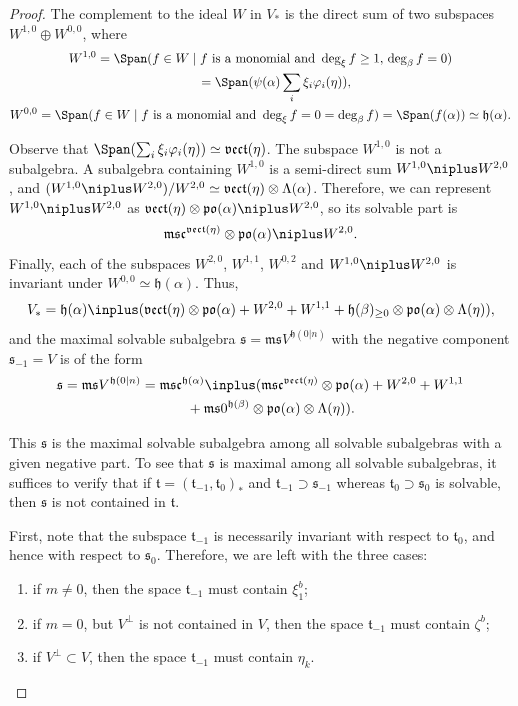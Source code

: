 \documentclass[10pt,a4paper]{amsart}
\newcommand {\fc} {{\mathfrak{c}}}
\newcommand {\fh} {{\mathfrak{h}}}
\newcommand {\fm} {{\mathfrak{m}}}
\newcommand {\fpo} {{\mathfrak{po}}}
\newcommand {\fs} {{\mathfrak{s}}}
\newcommand {\ft} {{\mathfrak{t}}}
\newcommand {\fvect} {{\mathfrak{vect}}} %
\newcommand {\<} [2] {{\left.\vphantom{#2}\right.^{#1\!}\!{#2}}}
\numberwithin{equation}{section}
\begin{document}
\begin{proof}
The complement to the ideal $W$ in $V_*$ is the direct sum of two subspaces $W^{1,0}\oplus W^{0,0}$, where
\begin{gather*}
 W^{1,0}=\Span(f\in W\mid f   \ \text{is a monomial and}\ \deg_\xi f\ge 1,\, \deg_\beta f=0) \\
 \hphantom{W^{1,0}}{} =\Span(\psi(\alpha)\sum_i \xi_i\varphi_i(\eta)),\\
 W^{0,0}=\Span(f\in W\mid f \   \text{is a monomial and}  \ \deg_\xi f=0
= \deg_\beta f)
=\Span(f(\alpha))\simeq \fh(\alpha).
\end{gather*}

Observe that $\Span (\sum_i \xi_i\varphi_i(\eta))\simeq \fvect(\eta)$. The subspace $W^{1,0}$ is not a subalgebra. A subalgebra containing $W^{1,0}$ is a semi-direct sum $W^{1,0}\niplus W^{2,0}$, and
$(W^{1,0}\niplus W^{2,0})/W^{2,0} \simeq \fvect(\eta)\otimes \Lambda(\alpha)$. Therefore, we can represent $W^{1,0}\niplus W^{2,0}$ as $\fvect(\eta)\otimes \fpo(\alpha)\niplus W^{2,0}$, so its solvable part is
\[
\fm\fs\fc^{\fvect(\eta)}\otimes \fpo(\alpha)\niplus W^{2,0}.
\]
Finally, each of the subspaces $W^{2,0}$, $W^{1,1}$, $W^{0,2}$ and $W^{1,0}\niplus W^{2,0}$ is invariant under
$W^{0,0}\simeq\fh(\alpha)$.
Thus,
\[
V_*=\fh(\alpha)\inplus(\fvect(\eta)\otimes \fpo(\alpha)+W^{2,0}+W^{1,1}+\fh(\beta)_{\ge 0}\otimes \fpo(\alpha) \otimes \Lambda(\eta)),
\]
and the maximal solvable subalgebra $\fs=\fm\fs V^{\fh(0|n)}$ with the negative component $\fs_{-1}=V$ is of the form
\begin{gather}
\fs=\fm\fs V^{\fh(0|n)}=\fm\fs\fc^{\fh(\alpha)}\inplus (\fm\fs\fc^{\fvect(\eta)}\otimes \fpo(\alpha)+W^{2,0}+W^{1,1}\nonumber\\
\hphantom{\fs=}{}+\fm\fs 0^{\fh(\beta)}\otimes \fpo(\alpha) \otimes \Lambda(\eta)).\label{msV}
\end{gather}

This $\fs$ is the maximal solvable subalgebra among all solvable subalgebras with a given negative part. To see that $\fs$ is maximal among all solvable subalgebras, it suffices to verify that if $\ft=(\ft_{-1},\ft_0)_*$ and $\ft_{-1}\supset\fs_{-1}$ whereas $\ft_{0}\supset\fs_{0}$ is solvable, then $\fs$ is not contained in $\ft$.

First, note that the subspace $\ft_{-1}$ is necessarily invariant with respect to $\ft_0$, and hence with respect to $\fs_0$. Therefore, we are left with the three cases:
\begin{enumerate}\itemsep=0pt
\item[(i)] if $m\ne 0$, then the space $\ft_{-1}$ must contain $\xi^b_1$;
\item[(ii)] if $m=0$, but $V^\perp$ is not contained in $V$, then the space $\ft_{-1}$ must contain $\zeta^b$;
\item[(iii)] if $V^\perp\subset V$, then the space $\ft_{-1}$ must contain $\eta_k$.
\end{enumerate}


\end{proof}
\end{document}
